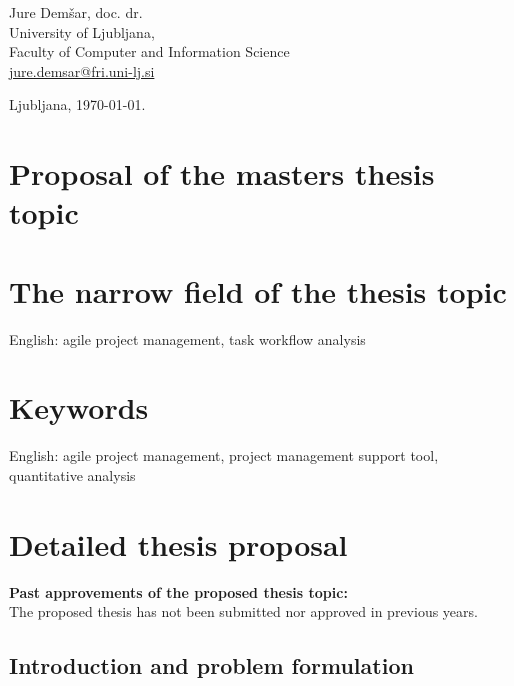 \documentclass[a4paper, 12pt]{article}
\begin{document}
\hfill\begin{minipage}{\dimexpr\textwidth-2cm}
Jure Demšar, doc. dr. \\
University of Ljubljana, \\
Faculty of Computer and Information Science\\
\href{mailto:jure.demsar@fri.uni-lj.si}{jure.demsar@fri.uni-lj.si}
\end{minipage}

\bigskip

\hfill Ljubljana, \today.


\clearpage
\section*{Proposal of the masters thesis topic}

\section{The narrow field of the thesis topic}

English: agile project management, task workflow analysis


\section{Keywords}

English: agile project management, project management support tool, quantitative analysis


\section{Detailed thesis proposal}


\textbf{Past approvements of the proposed thesis topic:}\\
The proposed thesis has not been submitted nor approved in previous years.

\subsection{Introduction and problem formulation}
\end{document}
